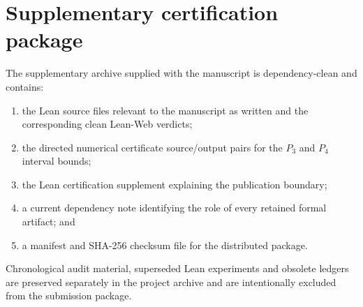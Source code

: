 \documentclass{aomart}
\theoremstyle{definition}
\newcommand{\1}{\mathbf 1}
\begin{document}
\section{Supplementary certification package}
The supplementary archive supplied with the manuscript is dependency-clean and contains:
\begin{enumerate}[label=(\roman*)]
\item the Lean source files relevant to the manuscript as written and the corresponding clean Lean-Web verdicts;
\item the directed numerical certificate source/output pairs for the $P_3$ and $P_4$ interval bounds;
\item the Lean certification supplement explaining the publication boundary;
\item a current dependency note identifying the role of every retained formal artifact; and
\item a manifest and SHA-256 checksum file for the distributed package.
\end{enumerate}
Chronological audit material, superseded Lean experiments and obsolete ledgers are preserved separately in the project archive and are intentionally excluded from the submission package.



\end{document}
